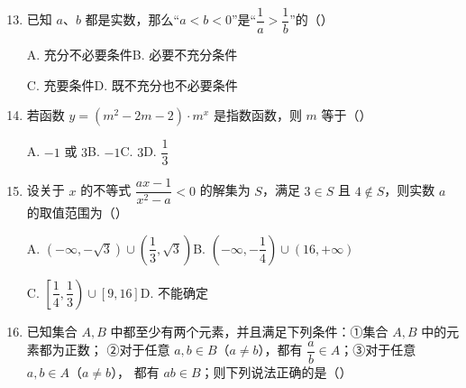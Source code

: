 \documentclass[a4paper,11pt]{article}
\begin{document}
\begin{enumerate}
\setcounter{enumi}{12}

\item 已知 $a$、$b$ 都是实数，那么“$a<b<0$”是“$\dfrac1a>\dfrac1b$”的\mbox{（\quad）}

\keepwithprev
A. 充分不必要条件\qquad\qquad B. 必要不充分条件

C. 充要条件\qquad\qquad D. 既不充分也不必要条件

\ifanswer
\solbegin
{}
\solend
\fi

\item 若函数 $y=(m^2-2m-2)\cdot m^x$ 是指数函数，则 $m$ 等于\mbox{（\quad）}

\keepwithprev
A. $-1$ 或 $3$\qquad\qquad B. $-1$\qquad\qquad C. $3$\qquad\qquad D. $\dfrac13$

\ifanswer
\solbegin
{}
\solend
\fi

\item 设关于 $x$ 的不等式 $\dfrac{ax-1}{x^2-a}<0$ 的解集为 $S$，满足 $3\in S$ 且 $4\notin S$，则实数 $a$ 的取值范围为\mbox{（\quad）}

\keepwithprev
A. $(-\infty,-\sqrt3)\cup\left(\dfrac13,\sqrt3\right)$\qquad\qquad B. $\left(-\infty,-\dfrac14\right)\cup(16,+\infty)$

C. $\left[\dfrac14,\dfrac13\right)\cup[9,16]$\qquad\qquad D. 不能确定

\ifanswer
\solbegin
{}
\solend
\fi

\item 已知集合 $A,B$ 中都至少有两个元素，并且满足下列条件：①集合 $A,B$ 中的元素都为正数；
②对于任意 $a,b\in B$（$a\ne b$），都有 $\dfrac ab\in A$；③对于任意 $a,b\in A$（$a\ne b$），
都有 $ab\in B$；则下列说法正确的是\mbox{（\quad）}


\end{enumerate}
\end{document}
